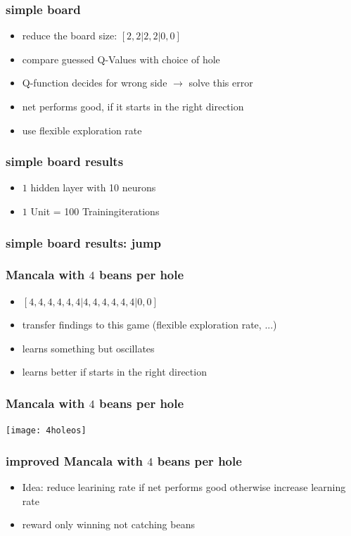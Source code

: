 \documentclass{beamer}
\begin{document}
 \begin{frame}
 \frametitle{simple board}
 \begin{itemize}
\item reduce the board size: $[2,2|2,2|0,0]$
\item compare guessed Q-Values with choice of hole
\item Q-function decides for wrong side $\rightarrow$ solve this error
\item net performs good, if it starts in the right direction
\item use flexible exploration rate
\end{itemize}
 \end{frame}

 \begin{frame}
 \frametitle{simple board results}
\begin{itemize}
\item $1$ hidden layer with 10 neurons
\item $1$ Unit = 100 Trainingiterations
\end{itemize}
 \end{frame}

 \begin{frame}
 \frametitle{simple board results: jump}
 \end{frame}

 \begin{frame}
 \frametitle{Mancala with $4$ beans per hole}
 \begin{itemize}
\item  $[4,4,4,4,4,4|4,4,4,4,4,4|0,0]$
\item transfer findings to this game (flexible exploration rate, ...)
\item learns something but oscillates 
\item  learns better if starts in the right direction
\end{itemize}
 \end{frame}

 \begin{frame}
 \frametitle{Mancala with $4$ beans per hole}
 \texttt{[image: 4holeos]}
 \end{frame}

\begin{frame}
\frametitle{improved Mancala with $4$ beans per hole}
\begin{itemize}
\item Idea: reduce learining rate if net performs good otherwise increase learning rate
\item reward only winning not catching beans
\end{itemize}
\end{frame}
\end{document}
